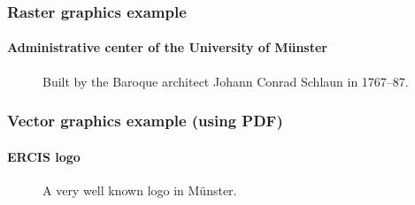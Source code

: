 \begin{frame}
    \frametitle{Raster graphics example}
    \framesubtitle{Administrative center of the University of Münster}

    \begin{figure}
        \begin{center}
            \caption{Built by the Baroque architect Johann Conrad Schlaun in 1767–87.}
        \end{center}
    \end{figure}
\end{frame}

\begin{frame}
    \frametitle{Vector graphics example (using PDF)}
    \framesubtitle{ERCIS logo}

    \begin{figure}
        \begin{center}
            \caption{A very well known logo in Münster.}
        \end{center}
    \end{figure}
\end{frame}

